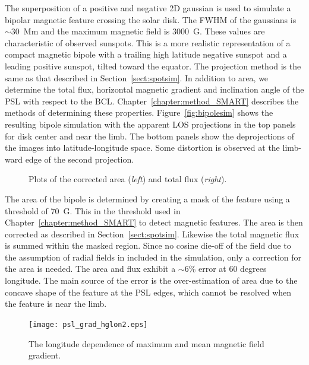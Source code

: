 The superposition of a positive and negative 2D gaussian is used to simulate a bipolar magnetic feature crossing the solar disk. The \gls{FWHM} of the gaussians is $\sim$30~Mm and the maximum magnetic field is 3000~G. These values are characteristic of observed sunspots. This is a more realistic representation of a compact magnetic bipole with a trailing high latitude negative sunspot and a leading positive sunspot, tilted toward the equator. The projection method is the same as that described in Section~\ref{sect:spotsim}. In addition to area, we determine the total flux, horizontal magnetic gradient and inclination angle of the \gls{PSL} with respect to the \gls{BCL}. Chapter~\ref{chapter:method_SMART} describes the methods of determining these properties. Figure~\ref{fig:bipolesim} shows the resulting bipole simulation with the apparent \gls{LOS} projections in the top panels for disk center and near the limb. The bottom panels show the deprojections of the images into latitude-longitude space. Some distortion is observed at the limb-ward edge of the second projection.

\begin{figure}[!ht]
\caption{Plots of the corrected area (\emph{left}) and total flux (\emph{right}).}\label{fig:bipoleareaflux}
\end{figure}

The area of the bipole is determined by creating a mask of the feature using a threshold of 70~G. This in the threshold used in Chapter~\ref{chapter:method_SMART} to detect magnetic features. The area is then corrected as described in Section~\ref{sect:spotsim}.  Likewise the total magnetic flux is summed within the masked region. Since no cosine die-off of the field due to the assumption of radial fields in included in the simulation, only a correction for the area is needed. The area and flux exhibit a $\sim$6\% error at 60 degrees longitude. The main source of the error is the over-estimation of area due to the concave shape of the feature at the \gls{PSL} edges, which cannot be resolved when the feature is near the limb.

\begin{figure}[!ht]
\begin{center}
\texttt{[image: psl\_grad\_hglon2.eps]}
\end{center}
\caption{The longitude dependence of maximum and mean magnetic field gradient.}\label{fig:bipolegradient}
\end{figure}

